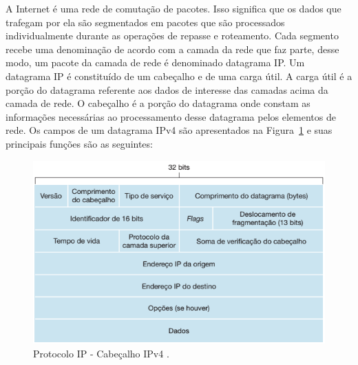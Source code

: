 \documentclass[	12pt, Times, openright, twoside, a4paper, english, brazil]{abntex2}
\begin{document}
A Internet é uma rede de comutação de pacotes. Isso significa que os dados que trafegam por ela são segmentados em pacotes que são processados individualmente durante as operações de repasse e roteamento. Cada segmento recebe uma denominação de acordo com a camada da rede que faz parte, desse modo, um pacote da camada de rede é denominado datagrama IP. Um datagrama IP é constituído de um cabeçalho e de uma carga útil. A carga útil é a porção do datagrama referente aos dados de interesse das camadas acima da camada de rede. O cabeçalho é a porção do datagrama onde constam as informações necessárias ao processamento desse datagrama pelos elementos de rede. Os campos de um datagrama IPv4 são apresentados na Figura~\ref{fig:cabecalho_IPv4} e suas principais funções são as seguintes:

\begin{figure}[ht!]
    \begin{center}  
    \includegraphics[width=400pt]{cabecalho-IP.png}
    \caption{Protocolo IP - Cabeçalho IPv4 .  \cite{kurose2013computer}}
    \label{fig:cabecalho_IPv4}
    \end{center}
\end{figure}
\end{document}
